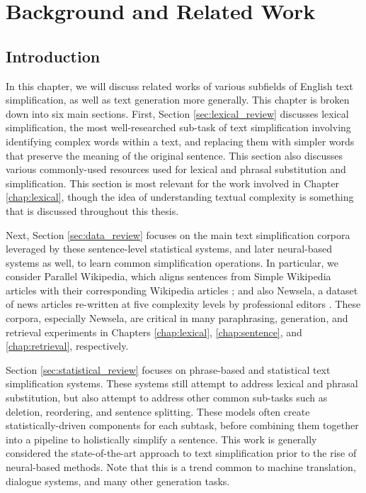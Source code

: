\documentclass[thesis.tex]{subfiles}
\begin{document}
\chapter{Background and Related Work}
\label{cha:cha2}

\section{Introduction}

In this chapter, we will discuss related works of various subfields of English text simplification, as well as text generation more generally. This chapter is broken down into six main sections. First, Section \ref{sec:lexical_review} discusses lexical simplification, the most well-researched sub-task of text simplification involving identifying complex words within a text, and replacing them with simpler words that preserve the meaning of the original sentence. This section also discusses various commonly-used resources used for lexical and phrasal substitution and simplification. This section is most relevant for the work involved in Chapter \ref{chap:lexical}, though the idea of understanding textual complexity is something that is discussed throughout this thesis.

Next, Section \ref{sec:data_review} focuses on the main text simplification corpora leveraged by these sentence-level statistical systems, and later neural-based systems as well, to learn common simplification operations. In particular, we consider Parallel Wikipedia, which aligns sentences from Simple Wikipedia articles with their corresponding Wikipedia articles \citep{zhu2010monolingual}; and also Newsela, a dataset of news articles re-written at five complexity levels by professional editors \citep{xu2015problems}. These corpora, especially Newsela, are critical in many paraphrasing, generation, and retrieval experiments in Chapters \ref{chap:lexical}, \ref{chap:sentence}, and \ref{chap:retrieval}, respectively.

Section \ref{sec:statistical_review} focuses on phrase-based and statistical text simplification systems. These systems still attempt to address lexical and phrasal substitution, but also attempt to address other common sub-tasks such as deletion, reordering, and sentence splitting. These models often create statistically-driven components for each subtask, before combining them together into a pipeline to holistically simplify a sentence. This work is generally considered the state-of-the-art approach to text simplification prior to the rise of neural-based methods. Note that this is a trend common to machine translation, dialogue systems, and many other generation tasks.
\end{document}
